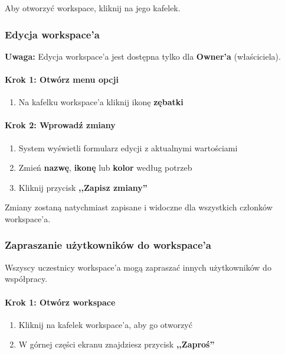 \documentclass[12pt,a4paper]{article}
\begin{document}
Aby otworzyć workspace, kliknij na jego kafelek.

\subsubsection{Edycja workspace'a}

\textbf{Uwaga:} Edycja workspace'a jest dostępna tylko dla \textbf{Owner'a} (właściciela).

\paragraph{Krok 1: Otwórz menu opcji}

\begin{enumerate}
    \item Na kafelku workspace'a kliknij ikonę \textbf{zębatki}
\end{enumerate}

\paragraph{Krok 2: Wprowadź zmiany}

\begin{enumerate}
    \item System wyświetli formularz edycji z aktualnymi wartościami
    \item Zmień \textbf{nazwę}, \textbf{ikonę} lub \textbf{kolor} według potrzeb
    \item Kliknij przycisk \textbf{,,Zapisz zmiany''}
\end{enumerate}

Zmiany zostaną natychmiast zapisane i widoczne dla wszystkich członków workspace'a.

\subsubsection{Zapraszanie użytkowników do workspace'a}

Wszyscy uczestnicy workspace'a mogą zapraszać innych użytkowników do współpracy.

\paragraph{Krok 1: Otwórz workspace}

\begin{enumerate}
    \item Kliknij na kafelek workspace'a, aby go otworzyć
    \item W górnej części ekranu znajdziesz przycisk \textbf{,,Zaproś''}
\end{enumerate}
\end{document}

